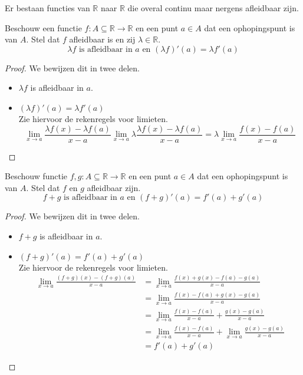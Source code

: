 \documentclass[main.tex]{subfiles}
\begin{document}
\begin{st}
  Er bestaan functies van $\mathbb{R}$ naar $\mathbb{R}$ die overal continu maar nergens afleidbaar zijn.
\end{st}

\begin{pr}
  Beschouw een functie $f: A \subseteq \mathbb{R} \rightarrow \mathbb{R}$ en een punt $a\in A$ dat een ophopingspunt is van $A$.
  Stel dat $f$ afleidbaar is en zij $\lambda \in \mathbb{R}$.
  \[ \lambda f \text{ is afleidbaar in } a \text{ en } (\lambda f)'(a) = \lambda f'(a) \]

  \begin{proof}
    We bewijzen dit in twee delen.
    \begin{itemize}
    \item $\lambda f$ is afleidbaar in $a$.
    \item $(\lambda f)'(a) = \lambda f'(a)$\\
      Zie hiervoor de rekenregels voor limieten.
      \[ \lim_{x \rightarrow a}\frac{\lambda f(x)-\lambda f(a)}{x-a} \lim_{x \rightarrow a}\lambda \frac{\lambda f(x)-\lambda f(a)}{x-a} = \lambda \lim_{x \rightarrow a}\frac{f(x)-f(a)}{x-a} \]
    \end{itemize}
  \end{proof}
\end{pr}


\begin{pr}
  Beschouw functie $f,g: A \subseteq \mathbb{R} \rightarrow \mathbb{R}$ en een punt $a\in A$ dat een ophopingspunt is van $A$.
  Stel dat $f$ en $g$ afleidbaar zijn.
  \[ f+g \text{ is afleidbaar in } a \text{ en } (f+g)'(a) = f'(a) + g'(a) \]

  \begin{proof}
    We bewijzen dit in twee delen.
    \begin{itemize}
    \item $f+g$ is afleidbaar in $a$.
    \item $(f+g)'(a) = f'(a) + g'(a)$\\
      Zie hiervoor de rekenregels voor limieten.
      \[
      \begin{array}{rl}
        \lim_{x \rightarrow a}\frac{(f+g)(x)-(f+g)(a)}{x-a}
        &= \lim_{x \rightarrow a}\frac{f(x)+g(x)-f(a)-g(a)}{x-a}\\
        &= \lim_{x \rightarrow a}\frac{f(x)-f(a)+g(x)-g(a)}{x-a}\\
        &= \lim_{x \rightarrow a}\frac{f(x)-f(a)}{x-a}+\frac{g(x)-g(a)}{x-a}\\
        &= \lim_{x \rightarrow a}\frac{f(x)-f(a)}{x-a}+\lim_{x \rightarrow a}\frac{g(x)-g(a)}{x-a}\\
        &= f'(a) + g'(a)
      \end{array}
      \]
    \end{itemize}

  \end{proof}
\end{pr}
\end{document}
